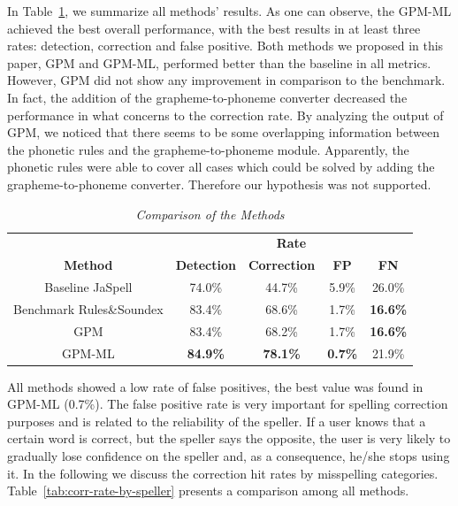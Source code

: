 In Table~\ref{tab:sys-comparison}, we summarize all methods' results. As one can observe, the GPM-ML achieved the best overall performance, with the best results in at least three rates: detection, correction and false positive. Both methods we proposed in this paper, GPM and GPM-ML, performed better than the baseline in all metrics. However, GPM did not show any improvement in comparison to the benchmark. In fact, the addition of the grapheme-to-phoneme converter decreased the performance in what concerns to the correction rate. By analyzing the output of GPM, we noticed that there seems to be some overlapping information between the phonetic rules and the grapheme-to-phoneme module. Apparently, the phonetic rules were able to cover all cases which could be solved by adding the grapheme-to-phoneme converter. Therefore our hypothesis was not supported. 


\begin{table}[!ht]
\scriptsize
\centering
\caption{\label{tab:sys-comparison} {\it Comparison of the Methods}}
\begin{tabular}{|ccccc|}
\hline
 & \multicolumn{4}{c|}{\textbf{Rate}} \\ \cline{2-5}
\textbf{Method} & \textbf{Detection} & \textbf{Correction} & \textbf{FP} & \textbf{FN} \\ \hline
Baseline JaSpell & 74.0\% & 44.7\% & 5.9\% & 26.0\% \\
Benchmark Rules\&Soundex & 83.4\% & 68.6\% & 1.7\% & \textbf{16.6\%} \\
GPM & 83.4\% & 68.2\% & 1.7\% & \textbf{16.6\%} \\
GPM-ML  & \textbf{84.9\%} & \textbf{78.1\%} & \textbf{0.7\%} & 21.9\% \\ \hline
\end{tabular}
\end{table}


All methods showed a low rate of false positives, the best value was found in GPM-ML (0.7\%). The false positive rate is very important for spelling correction purposes and is related to the reliability of the speller. 
If a user knows that a certain word is correct, but the speller says the opposite, the user is very likely to gradually lose confidence on the speller and, as a consequence, he/she stops using it.
In the following we discuss the correction hit rates by misspelling categories. Table~\ref{tab:corr-rate-by-speller} presents a comparison among all methods.

